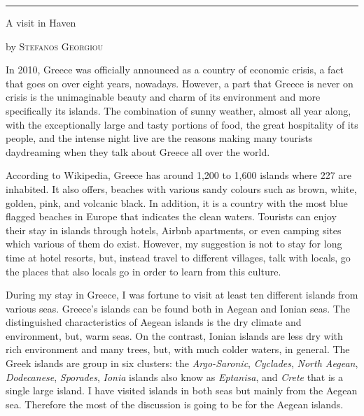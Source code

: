\documentclass[10pt,a4paper]{article} %
\newcommand{\SepRule}{\noindent	%
\begin{center}
\rule{250pt}{1pt} %
\end{center}
}
\newcommand{\NewsItem}[1]{ %
\usefont{T1}{fvs}{n}{n} %
\vspace{24pt}\large #1\vspace{3pt} %
\par \normalsize \normalfont}
\newcommand{\NewsAuthor}[1]{ %
\hfill by \textsc{#1} \vspace{20pt} %
\par \normalfont}
\begin{document}
\vspace{0.5cm}
\SepRule %
\vspace{0.5cm}

\begin{multicols}{3} %


\NewsItem{A visit in Haven}
\NewsAuthor{Stefanos Georgiou}

In 2010, Greece was officially announced as a country of economic crisis, 
a fact that goes on over eight years, nowadays. 
However, a part that Greece is never on crisis is the unimaginable beauty and charm 
of its environment and more specifically its islands. 
The combination of sunny weather, almost all year along, with the exceptionally 
large and tasty portions of food, the great hospitality of its people, and the 
intense night live are the reasons making many tourists daydreaming when they talk 
about Greece all over the world.  


According to Wikipedia, Greece has around 1,200 to 1,600 islands where 227 
are inhabited. 
It also offers, beaches with various sandy colours such as brown, white, golden, 
pink, and volcanic black. 
In addition, it is a country with the most blue flagged beaches in Europe that 
indicates the clean waters. 
Tourists can enjoy their stay in islands through hotels, Airbnb apartments, 
or even camping sites which various of them do exist. 
However, my suggestion is not to stay for long time at hotel resorts, but, instead 
travel to different villages, talk with locals, go the places that also locals 
go in order to learn from this culture.  


During my stay in Greece, I was fortune to visit at least ten different 
islands from various seas. 
Greece's islands can be found both in Aegean and Ionian seas. 
The distinguished characteristics of Aegean islands is the dry climate and 
environment, but, warm seas. 
On the contrast, Ionian islands are less dry with rich environment and many 
trees, but, with much colder waters, in general. 
The Greek islands are group in six clusters: the \textit{Argo-Saronic}, \textit{Cyclades}, 
\textit{North Aegean}, \textit{Dodecanese}, \textit{Sporades}, \textit{Ionia} islands also know as \textit{Eptanisa}, 
and \textit{Crete} that is a single large island.
I have visited islands in both seas but mainly from the Aegean sea. 
Therefore the most of the discussion is going to be for the Aegean islands. 



\end{multicols}
\end{document}

